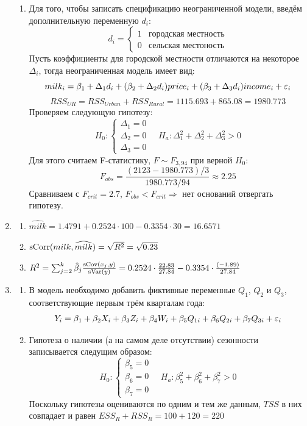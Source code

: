 \documentclass[12pt, a4paper]{article}
\begin{document}
\begin{enumerate}
\begin{enumerate}
\item Для того, чтобы записать спецификацию неограниченной модели, введём дополнительную переменную $d_i$:
\[
d_i = \begin{cases}
1 & \text{городская местность} \\
0 & \text{сельская местоность}
\end{cases}
\]
Пусть коэффициенты для городской местности отличаются на некоторое $\Delta_i$, тогда неограниченная модель имеет вид:
\[
milk_i = \beta_1 + \Delta_1 d_i + (\beta_2 + \Delta_2 d_i) price_i + (\beta_3 + \Delta_3 d_i) income_i + \varepsilon_i
\]
\[
RSS_{UR} = RSS_{Urban} + RSS_{Rural} = 1115.693 + 865.08 = 1980.773
\]
Проверяем следующую гипотезу:
\[
H_0: \begin{cases}
\Delta_1 = 0 \\
\Delta_2 = 0 \\
\Delta_3 = 0
\end{cases}
\quad
H_a: \Delta_1^2 + \Delta_2^2 + \Delta_3^2 >0
\]
Для этого считаем F-статистику, $F \sim F_{3, 94}$ при верной $H_0$:
\[
F_{obs} = \frac{(2123 - 1980.773)/3}{1980.773/94} \approx 2.25
\]
Сравниваем с $F_{crit} = 2.7$, $F_{obs} < F_{crit} \Rightarrow$ нет оснований отвергать гипотезу.
\end{enumerate}
\item
\begin{enumerate}
\item $\widehat{milk} = 1.4791 + 0.2524 \cdot 100 - 0.3354 \cdot 30 = 16.6571$
\item $\operatorname{sCorr}(milk, \widehat{milk}) = \sqrt{R^2} = \sqrt{0.23}$
\item $R^2 = \sum_{j=2}^{k} \hat{\beta}_j \frac{\operatorname{sCov}(x_j, y)}{\operatorname{sVar}(y)} = 0.2524 \cdot \frac{22.83}{27.84} - 0.3354 \cdot \frac{(-1.89)}{27.84}$
\end{enumerate}
\item
\begin{enumerate}
\item В модель необходимо добавить фиктивные переменные $Q_1$, $Q_2$ и $Q_3$, соответствующие первым трём кварталам года:
\[
Y_i = \beta_1 + \beta_2 X_i + \beta_3 Z_i + \beta_4 W_i + \beta_5 Q_{1i} + \beta_6 Q_{2i} + \beta_7 Q_{3i} + \varepsilon_i
\]
\item Гипотеза о наличии (а на самом деле отсутствии) сезонности записывается следущим образом:
\[
H_0: \begin{cases}
\beta_5 = 0 \\
\beta_6 = 0 \\
\beta_7 = 0
\end{cases}
\quad
H_{a}: \beta_5^2 + \beta_6^2 + \beta_7^2 > 0
\]
Поскольку гипотезы оцениваются по одним и тем же данным, $TSS$ в них совпадает и равен $ESS_{R} + RSS_{R} = 100 + 120 = 220$


\end{enumerate}
\end{enumerate}
\end{document}
